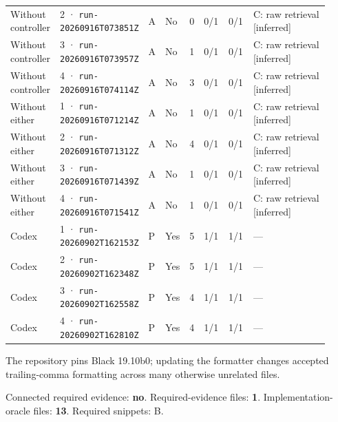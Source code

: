 \begin{landscape}
\begin{longtable}{@{}L{0.11\linewidth}L{0.16\linewidth}*{1}{L{0.022\linewidth}}L{0.05\linewidth}L{0.045\linewidth}L{0.08\linewidth}L{0.085\linewidth}L{0.368\linewidth}@{}}
Without controller & 2 · \texttt{run-20260916\allowbreak T073851Z} & A & No & 0 & 0/1 & 0/1 & C: raw retrieval [inferred] \\
Without controller & 3 · \texttt{run-20260916\allowbreak T073957Z} & A & No & 1 & 0/1 & 0/1 & C: raw retrieval [inferred] \\
Without controller & 4 · \texttt{run-20260916\allowbreak T074114Z} & A & No & 3 & 0/1 & 0/1 & C: raw retrieval [inferred] \\
Without either & 1 · \texttt{run-20260916\allowbreak T071214Z} & A & No & 1 & 0/1 & 0/1 & C: raw retrieval [inferred] \\
Without either & 2 · \texttt{run-20260916\allowbreak T071312Z} & A & No & 4 & 0/1 & 0/1 & C: raw retrieval [inferred] \\
Without either & 3 · \texttt{run-20260916\allowbreak T071439Z} & A & No & 1 & 0/1 & 0/1 & C: raw retrieval [inferred] \\
Without either & 4 · \texttt{run-20260916\allowbreak T071541Z} & A & No & 1 & 0/1 & 0/1 & C: raw retrieval [inferred] \\
Codex & 1 · \texttt{run-20260902\allowbreak T162153Z} & P & Yes & 5 & 1/1 & 1/1 & --- \\
Codex & 2 · \texttt{run-20260902\allowbreak T162348Z} & P & Yes & 5 & 1/1 & 1/1 & --- \\
Codex & 3 · \texttt{run-20260902\allowbreak T162558Z} & P & Yes & 4 & 1/1 & 1/1 & --- \\
Codex & 4 · \texttt{run-20260902\allowbreak T162810Z} & P & Yes & 4 & 1/1 & 1/1 & --- \\
\end{longtable}
\endgroup
\end{landscape}

\label{sec:pandas-dev-pandas-35925}

The repository pins Black 19.10b0; updating the formatter changes accepted trailing-comma formatting across many otherwise unrelated files.

Connected required evidence: \textbf{no}. Required-evidence files: \textbf{1}. Implementation-oracle files: \textbf{13}. Required snippets: B.


